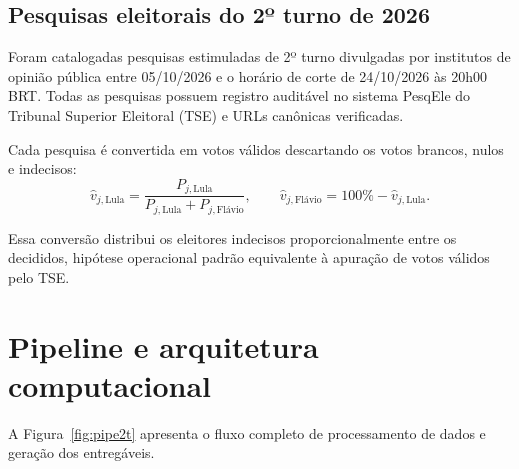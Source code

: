 \documentclass[10.5pt,a4paper]{article}
\begin{document}
\subsection{Pesquisas eleitorais do 2º turno de 2026}
Foram catalogadas \nPesq{} pesquisas estimuladas de 2º turno divulgadas por \nInst{} institutos de opinião pública entre 05/10/2026 e o horário de corte de 24/10/2026 às 20h00 BRT. Todas as pesquisas possuem registro auditável no sistema PesqEle do Tribunal Superior Eleitoral (TSE) e URLs canônicas verificadas.

Cada pesquisa é convertida em votos válidos descartando os votos brancos, nulos e indecisos:
\begin{equation}
\hat{v}_{j, \text{Lula}} = \frac{P_{j, \text{Lula}}}{P_{j, \text{Lula}} + P_{j, \text{Flávio}}}, \qquad \hat{v}_{j, \text{Flávio}} = 100\% - \hat{v}_{j, \text{Lula}}.
\end{equation}

Essa conversão distribui os eleitores indecisos proporcionalmente entre os decididos, hipótese operacional padrão equivalente à apuração de votos válidos pelo TSE.

\section{Pipeline e arquitetura computacional}

A Figura~\ref{fig:pipe2t} apresenta o fluxo completo de processamento de dados e geração dos entregáveis.
\end{document}
